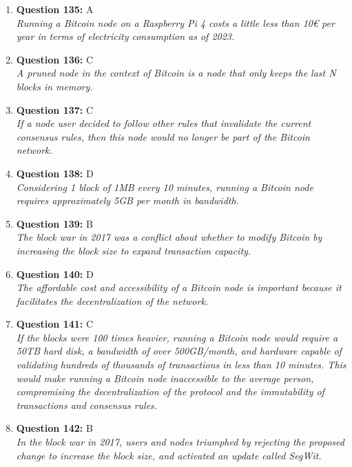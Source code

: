 \documentclass[12pt,a4paper]{article}
\begin{document}
\begin{enumerate}
\item \textbf{Question 135:} A
\\ \textit{Running a Bitcoin node on a Raspberry Pi 4 costs a little less than 10€ per year in terms of electricity consumption as of 2023.}

\item \textbf{Question 136:} C
\\ \textit{A pruned node in the context of Bitcoin is a node that only keeps the last N blocks in memory.}

\item \textbf{Question 137:} C
\\ \textit{If a node user decided to follow other rules that invalidate the current consensus rules, then this node would no longer be part of the Bitcoin network.}

\item \textbf{Question 138:} D
\\ \textit{Considering 1 block of 1MB every 10 minutes, running a Bitcoin node requires approximately 5GB per month in bandwidth.}

\item \textbf{Question 139:} B
\\ \textit{The block war in 2017 was a conflict about whether to modify Bitcoin by increasing the block size to expand transaction capacity.}

\item \textbf{Question 140:} D
\\ \textit{The affordable cost and accessibility of a Bitcoin node is important because it facilitates the decentralization of the network.}

\item \textbf{Question 141:} C
\\ \textit{If the blocks were 100 times heavier, running a Bitcoin node would require a 50TB hard disk, a bandwidth of over 500GB/month, and hardware capable of validating hundreds of thousands of transactions in less than 10 minutes. This would make running a Bitcoin node inaccessible to the average person, compromising the decentralization of the protocol and the immutability of transactions and consensus rules.}

\item \textbf{Question 142:} B
\\ \textit{In the block war in 2017, users and nodes triumphed by rejecting the proposed change to increase the block size, and activated an update called SegWit.}


\end{enumerate}
\end{document}
